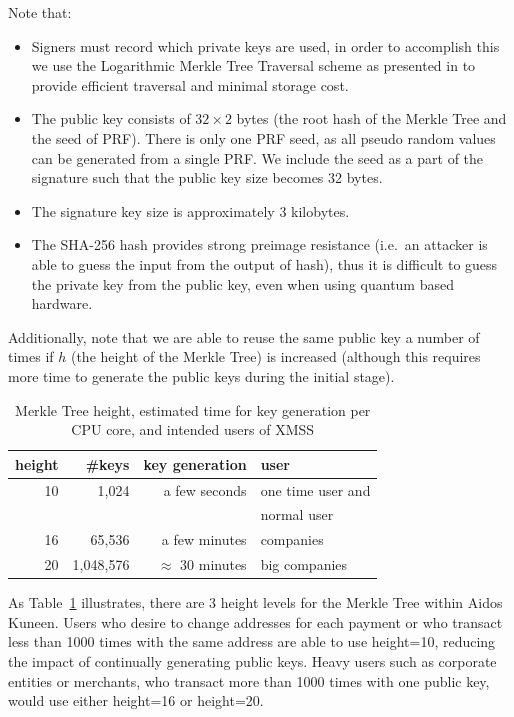 \documentclass[a4paper,10pt,twocolumn]{article}
\begin{document}
Note that:
\vspace{-0.5\baselineskip}
\begin{itemize}
	\setlength\itemsep{0em}
	\item Signers must record which private keys are used, in order to accomplish this we use the Logarithmic Merkle Tree Traversal 
	scheme as presented in \cite{traverse} to provide efficient traversal and minimal storage cost. \item The public key consists of 
	\(32 \times 2 \) bytes (the root hash of the Merkle Tree and the seed of PRF).	There is only one PRF seed, as all pseudo random 
	values can be generated from a single PRF\@. We include the seed as a part of the signature such that the public key size becomes 
	32 bytes. \item  The signature key size is approximately 3 kilobytes. \item The SHA-256 hash provides strong preimage resistance 
	(i.e.\ an attacker is able to guess the input from the output of hash), thus it is difficult to guess the private key from the 
	public key, even when using quantum based hardware.
\end{itemize}
		
Additionally, note that we are able to reuse the same public key a number of times if \(h\) (the height of the Merkle Tree) is increased (although this requires more time to generate the public keys during the initial stage).

\begin{table}[ht]
	\caption{Merkle Tree height, estimated time for key generation per CPU core, and intended users of XMSS}
    \label{tbl:height}
	\begin{tabular}{rrrl} 
		\toprule
		height  & \#keys & key generation & user \\ 
		\midrule
			  10 & 1,024 &  a few seconds & one time user  and\\
			  & & & normal user \\
			  16 & 65,536 & a few minutes & companies\\
			  20 & 1,048,576 & \( \approx \) 30 minutes &  big companies\\ 
			  \bottomrule
			\end{tabular}
  \end{table}

As Table~\ref{tbl:height} illustrates, there are 3 height levels for the Merkle Tree within Aidos Kuneen. Users who desire to change 
addresses for each payment or who transact less than 1000 times with the same address are able to use height=10, reducing the impact of 
continually generating public keys. Heavy users such as corporate entities or merchants, who transact more than 1000 times with one 
public key, would use either height=16 or height=20.
\end{document}
